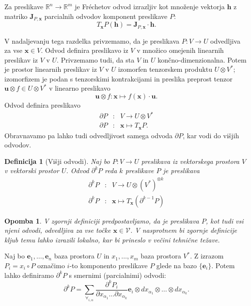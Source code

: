 \documentclass[a4paper, 12pt]{book}
\newcommand{\RR}{\mathbb{R}}
\newcommand{\VV}{\mathcal{V}}
\newcommand{\e}{\mathbf{e}}
\newcommand{\x}{\mathbf{x}}
\newcommand{\h}{\mathbf{h}}
\newcommand{\uu}{\mathbf{u}}
\newcommand{\D}{\partial}
\newtheorem{opomba}{Opomba}[chapter]
\newtheorem{definicija}{Definicija}[chapter]
\begin{document}
Za preslikave $\RR^n\to\RR^m$ je Fréchetov odvod izrazljiv kot množenje vektorja $\h$ z matriko $\mathbf{J}_{P,\x}$ parcialnih odvodov komponent preslikave $P$:
\begin{equation*}
  T_\x P(\h) = \mathbf{J}_{P,\x}\cdot \h.
\end{equation*}

V nadaljevanju tega razdelka privzemamo, da je preslikava $P:V\to U$ odvedljiva za vse $\x\in V$. Odvod definira preslikavo iz $V$ v množico omejenih linearnih preslikav iz $V$ v $U$. Privzemamo tudi, da sta $V$ in $U$ končno-dimenzionalna. Potem je prostor linearnih preslikav iz $V$ v $U$ izomorfen tenzorskem produktu $U\otimes V^*$; izomorfizem je podan s tenzorskimi kontrakcijami in preslika preprost tenzor $\uu\otimes f\in U\otimes V^*$ v linearno preslikavo
\begin{equation}
   \label{eq:lin_tenzor}
   \uu\otimes f:\x \mapsto f(\x)\cdot \uu.
 \end{equation}
Odvod definira preslikavo
\begin{eqnarray}
  \label{eq:odvod_preslikava}
  \D P&:& V\to U\otimes V^*\\
  \D P&:& \x \mapsto T_\x P.
\end{eqnarray}
Obravnavamo pa lahko tudi odvedljivost samega odvoda $\D P$, kar vodi do višjih odvodov.
\begin{definicija}[Višji odvodi]
Naj bo $P:V\to U$ preslikava iz vektorskega prostora $V$ v vektorski prostor $U$. Odvod $\D^k P$ reda $k$ preslikave $P$ je preslikava
\begin{eqnarray}\label{eq:partial}
    \label{eq:visji_odvod}
    \D^kP&:&V\to U\otimes (V^*)^{\otimes k}\\
    \D^kP&:&\x\mapsto T_\x\left( \D^{k-1}P \right)
  \end{eqnarray}
\end{definicija}
\begin{opomba}
V zgornji definiciji predpostavljamo, da je preslikava $P$, kot tudi vsi njeni odvodi, odvedljiva za vse točke $\x\in\VV$. V nasprotnem bi zgornje definicije kljub temu lahko izrazili lokalno, kar bi prineslo v večini tehnične težave.
\end{opomba}
Naj bo  $\e_1,\ldots,\e_n$ baza prostora $U$ in $x_1,\ldots, x_m$ baza prostora $V^*$. Z izrazom $P_i=x_i\circ P$ označimo $i$-to komponento preslikave $P$ glede na bazo $\{\e_i\}$. Potem lahko definiramo $\D^k P$ s smernimi (parcialnimi) odvodi:
\begin{equation}\label{eq:d}
	\partial^kP=\sum_{\forall_{i,\alpha}}\frac{\partial^k P_i}{\partial
	    x_{\alpha_1}\ldots \partial x_{\alpha_k}}\e_i\otimes
	  dx_{\alpha_1}\otimes\ldots \otimes dx_{\alpha_k}.
\end{equation}
\end{document}

